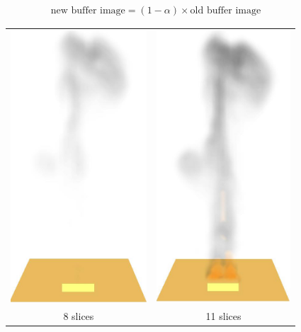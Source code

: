 {\begin{eqnarray}
\mbox{new buffer image} = (1-\alpha)\times \mbox{old buffer image}
\end{eqnarray}

\begin{figure}[\figoptions]
\begin{center}
\begin{tabular}{cc}
\includegraphics[height=4.0in]{FIGURES/splume_20_27}&
\includegraphics[height=4.0in]{FIGURES/splume_17_27}\\
8 slices&11 slices\\

\end{tabular}
\end{center}
\end{figure}}
